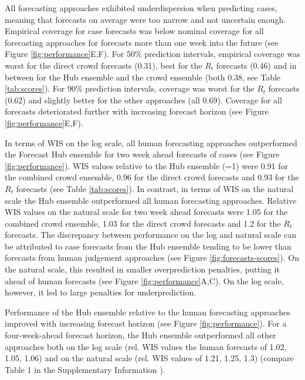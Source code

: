 \documentclass[10pt,a4paper,twocolumn]{article}
\begin{document}
All forecasting approaches exhibited underdispersion when predicting cases, meaning that forecasts on average were too narrow and not uncertain enough. Empirical coverage for case forecasts was below nominal coverage for all forecasting approaches for forecasts more than one week into the future (see Figure \ref{fig:performance}E,F). 
For 50\% prediction intervals, empirical coverage was worst for the direct crowd forecasts (0.31), best for the $R_t$ forecasts (0.46) and in between for the Hub ensemble and the crowd ensemble (both 0.38, see Table \ref{tab:scores}). For 90\% prediction intervals, coverage was worst for the $R_t$ forecasts (0.62) and slightly better for the other approaches (all 0.69). Coverage for all forecasts deteriorated further with increasing forecast horizon (see Figure \ref{fig:performance}E,F). 

In terms of WIS on the log scale, all human forecasting approaches outperformed the Forecast Hub ensemble for two week ahead forecasts of cases (see Figure \ref{fig:performance}). WIS values relative to the Hub ensemble (=1) were 0.91 for the combined crowd ensemble, 0.96 for the direct crowd forecasts and 0.93 for the $R_t$ forecasts (see Table \ref{tab:scores}). In contrast, in terms of WIS on the natural scale the Hub ensemble outperformed all human forecasting approaches. Relative WIS values on the natural scale for two week ahead forecasts were 1.05 for the combined crowd ensemble, 1.03 for the direct crowd forecasts and 1.2 for the $R_t$ forecasts. 
The discrepancy between performance on the log and natural scale  can be attributed to case forecasts from the Hub ensemble tending to be lower than forecasts from human judgement approaches (see Figure \ref{fig:forecasts-scores}). On the natural scale, this resulted in smaller overprediction penalties, putting it ahead of human forecasts (see Figure \ref{fig:performance}A,C). On the log scale, however, it led to large penalties for underprediction. 

Performance of the Hub ensemble relative to the human forecasting approaches improved with increasing forecast horizon (see Figure \ref{fig:performance}). For a four-week-ahead forecast horizon, the Hub ensemble outperformed all other approaches both on the log scale (rel. WIS values the human forecasts of 1.02, 1.05, 1.06) and on the natural scale (rel. WIS values of 1.21, 1.25, 1.3) (compare Table 1 in the Supplementary Information \cite{bosseSupplementaryInformationHuman2023}). 
\end{document}
